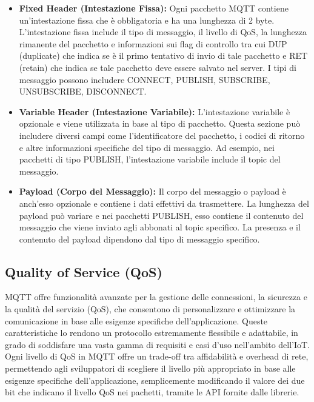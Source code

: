 \documentclass[12pt,a4paper,openright,twoside]{book}
\begin{document}
\begin{itemize}
\item \textbf{Fixed Header (Intestazione Fissa):} Ogni pacchetto \ac{MQTT} contiene un'intestazione fissa che è obbligatoria e ha una lunghezza di 2 byte. 
L'intestazione fissa include il tipo di messaggio, il livello di \ac{QoS}, la lunghezza rimanente del pacchetto e informazioni sui flag di controllo
tra cui DUP (duplicate) che indica se è il primo tentativo di invio di tale pacchetto e RET (retain) che indica se tale pacchetto deve essere salvato nel server.
I tipi di messaggio possono includere CONNECT, PUBLISH, SUBSCRIBE, UNSUBSCRIBE, DISCONNECT.
\item \textbf{Variable Header (Intestazione Variabile):} L'intestazione variabile è opzionale e viene utilizzata in base al tipo di pacchetto. 
Questa sezione può includere diversi campi come l'identificatore del pacchetto, i codici di ritorno e altre informazioni specifiche del tipo di messaggio. 
Ad esempio, nei pacchetti di tipo PUBLISH, l'intestazione variabile include il topic del messaggio.
\item \textbf{Payload (Corpo del Messaggio):} Il corpo del messaggio o payload è anch'esso opzionale e contiene i dati effettivi da trasmettere. 
La lunghezza del payload può variare e nei pacchetti PUBLISH, esso contiene il contenuto del messaggio che viene inviato agli abbonati al topic specifico. 
La presenza e il contenuto del payload dipendono dal tipo di messaggio specifico.
\end{itemize}

\subsection{Quality of Service (QoS)}

\ac{MQTT} offre funzionalità avanzate per la gestione delle connessioni, la sicurezza e la qualità del servizio (\ac{QoS}), che consentono di personalizzare e ottimizzare 
la comunicazione in base alle esigenze specifiche dell'applicazione. Queste caratteristiche lo rendono un protocollo estremamente flessibile e adattabile, 
in grado di soddisfare una vasta gamma di requisiti e casi d'uso nell'ambito dell'\ac{IoT}. 
Ogni livello di \ac{QoS} in \ac{MQTT} offre un trade-off tra affidabilità e overhead di rete, permettendo agli sviluppatori di scegliere il livello più appropriato in base alle esigenze 
specifiche dell'applicazione, semplicemente modificando il valore dei due bit che indicano il livello \ac{QoS} nei pachetti, tramite le API fornite dalle librerie. 
\end{document}
